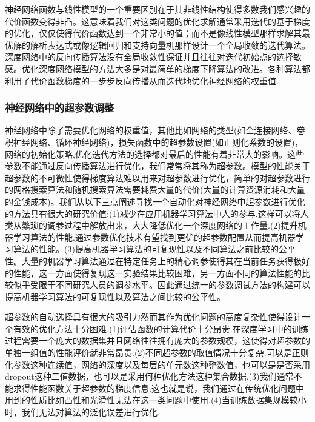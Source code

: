 \documentclass{ctexart}
\begin{document}
神经网络函数与线性模型的一个重要区别在于其非线性结构使得多数我们感兴趣的代价函数变得非凸。这意味着我们对这类问题的优化求解通常采用迭代的基于梯度的优化，仅仅使得代价函数达到一个非常小的值；而不是像线性模型那样求解其最优解的解析表达式或像逻辑回归和支持向量机那样设计一个全局收敛的迭代算法。深度网络中的反向传播算法没有全局收敛性保证并且往往对迭代初始点的选择敏感。优化深度网络模型的方法大多是对最简单的梯度下降算法的改进。各种算法都利用了代价函数梯度的一步步反向传播从而迭代地优化神经网络的权重值.\cite{goodfellow2016deep}

\subsubsection{神经网络中的超参数调整}
神经网络中除了需要优化网络的权重值，其他比如网络的类型(如全连接网络、卷积神经网络、循环神经网络)，损失函数中的超参数设置(如正则化系数的设置)，网络的初始化策略,优化迭代方法的选择都对最后的性能有着非常大的影响。这些参数不能通过反向传播算法进行优化，我们常常将其称为超参数。模型的性能关于超参数的不可微性使得梯度算法难以用来对超参数进行优化，简单的对超参数进行的网格搜索算法和随机搜索算法需要耗费大量的代价(大量的计算资源消耗和大量的金钱成本)。我们从以下三点阐述寻找一个自动化对神经网络中超参数进行优化的方法具有很大的研究价值:(1)减少在应用机器学习算法中人的参与.这样可以将人类从繁琐的调参过程中解放出来，大大降低优化一个深度网络的工作量.(2)提升机器学习算法的性能.通过参数优化技术有望找到更优的超参数配置从而提高机器学习算法的性能。(3)提高机器学习算法的可复现性以及不同算法之前比较的公平性。大量的机器学习算法通过在特定任务上的精心调参使得其在当前任务获得极好的性能，这一方面使得复现这一实验结果比较困难，另一方面不同的算法性能的比较似乎受限于不同研究人员的调参水平。因此通过统一的参数调试方法的构建可以提高机器学习算法的可复现性以及算法之间比较的公平性。


超参数的自动选择具有很大的吸引力然而其作为优化问题的高度复杂性使得设计一个有效的优化方法十分困难.(1)评估函数的计算代价十分昂贵.在深度学习中的训练过程需要一个庞大的数据集并且网络往往拥有庞大的参数规模，这使得对超参数的单独一组值的性能评价就非常昂贵.(2)不同超参数的取值情况十分复杂.可以是正则化参数这种连续值，网络的深度以及每层的单元数这种整数值，也可以是是否采用dropout这种二值数据，也可以是采用何种优化方法这种集合数据.(3)我们通常不能求得性能函数关于超参数的梯度信息.这也就是说，我们通过在传统优化问题中用到的性质比如凸性和光滑性无法在这一类问题中使用.(4)当训练数据集规模较小时，我们无法对算法的泛化误差进行优化.\cite{automl}\cite{feurer_hyperparameter_2018}
\end{document}
